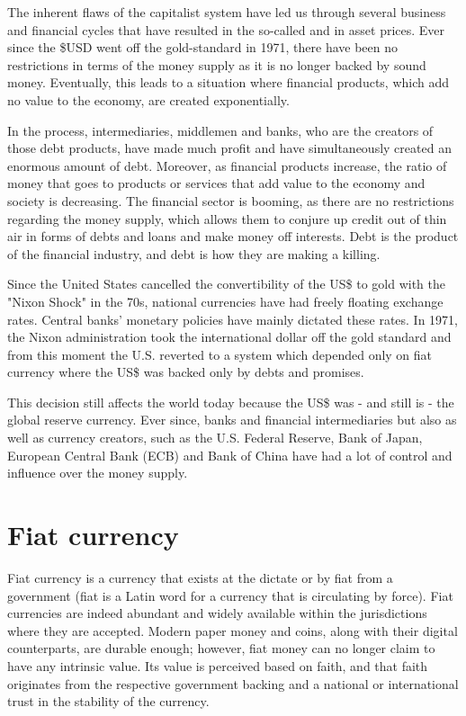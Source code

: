 The inherent flaws of the capitalist system have led us through several business and financial cycles that have resulted in the so-called  and  in asset prices. Ever since the \$USD went off the gold-standard in 1971, there  have been no restrictions  in terms of the money supply as it is no longer backed by sound money. Eventually, this leads to a situation where financial products, which add no value to the economy, are created exponentially.

In the process, intermediaries, middlemen and banks, who are the creators of those debt products, have made much profit and have simultaneously created an enormous amount of debt. Moreover, as financial products increase, the ratio of money that goes to products or services that add value to the economy and society is decreasing. The financial sector is booming, as there are no restrictions regarding the money supply, which allows them to conjure  up credit out of thin air in forms of debts and loans and make money off interests. Debt is the product of the financial industry, and debt is how they are making a killing.


    \begin{tcolorbox}
    [enhanced,
    title=Nixon shock - off the gold standard,
    frame style=
    {left color=orange!85!black,right color=yellow!95!black}]
    
      Since the United States cancelled the convertibility of the US\$ to gold with the "Nixon Shock" in the 70s, national currencies have had freely floating exchange rates. Central banks' monetary policies have mainly dictated these rates. In 1971, the Nixon administration took the international dollar off the gold standard and from this moment the U.S. reverted to a system which depended only on fiat currency where the US\$ was backed only by debts and promises. 
\end{tcolorbox}
\medskip

This decision still affects the world today because the US\$ was - and still is - the global reserve currency. Ever since, banks and financial intermediaries but also as well as currency creators, such as the U.S. Federal Reserve, Bank of Japan, European Central Bank (ECB) and Bank of China have had a lot of control and influence over the money supply.

\section{Fiat currency}       
Fiat currency is a currency that exists at the dictate or by fiat from a government (fiat is a Latin word for a currency that is circulating by force). Fiat currencies are indeed abundant and widely available within the jurisdictions where they are accepted. Modern paper money and coins, along with their digital counterparts, are durable enough; however, fiat money can no longer claim to have any intrinsic value. Its value is perceived based on faith, and that faith originates from the respective government backing and a national or international trust in the stability of the currency.

